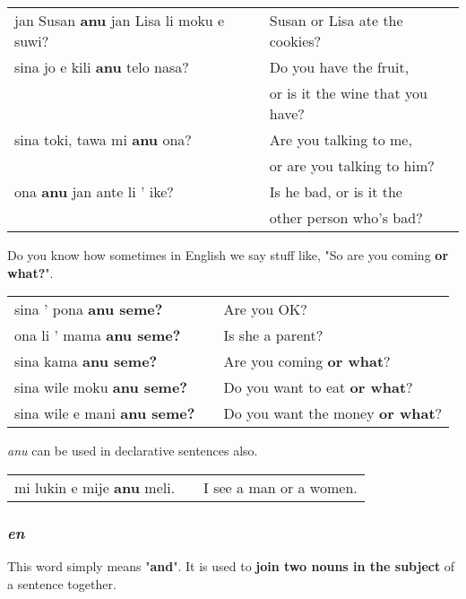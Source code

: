 \begin{supertabular}{p{5,5cm}|ll}
jan Susan \textbf{anu} jan Lisa li moku e suwi?  && Susan or Lisa ate the cookies? \\
sina jo e kili \textbf{anu} telo nasa? && Do you have the fruit, \\ && or is it the wine that you have? \\
sina toki, tawa mi \textbf{anu} ona? && Are you talking to me, \\ && or are you talking to him? \\
ona \textbf{anu} jan ante li ' ike? && Is he bad, or is it the \\ && other person who's bad? \\
\end{supertabular} 

Do you know how sometimes in English we say stuff like, "So are you coming \textbf{or what?}". 

\begin{supertabular}{p{5,5cm}|ll}
sina ' pona \textbf{anu seme?} && Are you OK? \\
ona li ' mama \textbf{anu seme?} && Is she a parent? \\
sina kama \textbf{anu seme?} && Are you coming \textbf{or what}? \\ 
sina wile moku \textbf{anu seme?} && Do you want to eat \textbf{or what}? \\
sina wile e mani \textbf{anu seme?} && Do you want the money \textbf{or what}? \\
\end{supertabular} 

\textit{anu} can be used in declarative sentences also.

\begin{supertabular}{p{5,5cm}|ll}
mi lukin e mije \textbf{anu} meli. && I see a man or a women. \\ 
\end{supertabular} 
%
\subsubsection*{\textit{en}}
%
This word simply means "\textbf{and}". 
It is used to \textbf{join two nouns in the subject} of a sentence together. 

